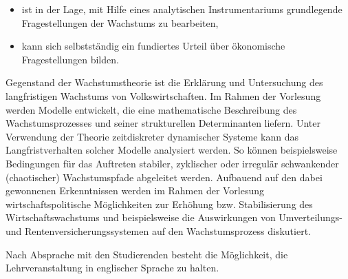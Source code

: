 \begin{course}
\begin{learningoutcomes}
 \begin{itemize}\item ist in der Lage, mit Hilfe eines analytischen Instrumentariums grundlegende Fragestellungen der Wachstums zu bearbeiten,  \item kann sich selbstständig ein fundiertes Urteil über ökonomische Fragestellungen bilden.  \end{itemize}
\end{learningoutcomes}

\begin{content}
Gegenstand der Wachstumstheorie ist die Erklärung und Untersuchung des langfristigen Wachstums von Volkswirtschaften. Im Rahmen der Vorlesung werden Modelle entwickelt, die eine mathematische Beschreibung des Wachstumsprozesses und seiner strukturellen Determinanten liefern. Unter Verwendung der Theorie zeitdiskreter dynamischer Systeme kann das Langfristverhalten solcher Modelle analysiert werden. So können beispielsweise Bedingungen für das Auftreten stabiler, zyklischer oder irregulär schwankender (chaotischer) Wachstumspfade abgeleitet werden. Aufbauend auf den dabei gewonnenen Erkenntnissen werden im Rahmen der Vorlesung wirtschaftspolitische Möglichkeiten zur Erhöhung bzw. Stabilisierung des Wirtschaftswachstums und beispielsweise die Auswirkungen von Umverteilungs- und Rentenversicherungssystemen auf den Wachstumsprozess diskutiert.


\end{content}





\begin{remarks}Nach Absprache mit den Studierenden besteht die Möglichkeit, die Lehrveranstaltung in englischer Sprache zu halten.

\end{remarks}

\end{course}